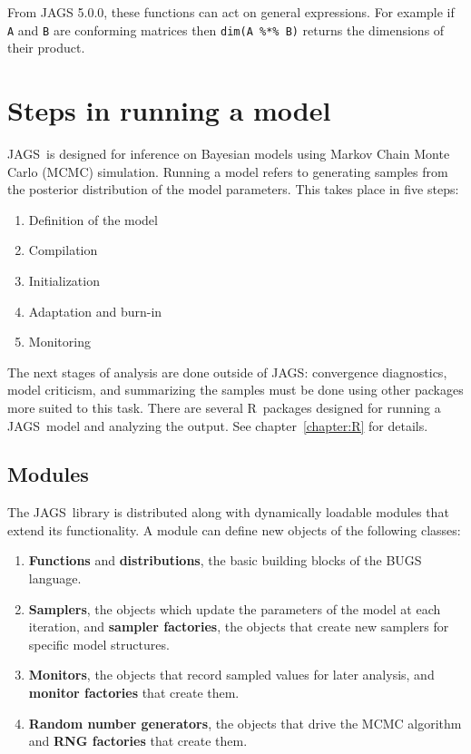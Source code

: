 \documentclass[11pt, a4paper, titlepage]{report}
\newcommand{\JAGS}{\textsf{JAGS}}
\newcommand{\R}{\textsf{R}}
\begin{document}
From JAGS 5.0.0, these functions can act on general expressions. For
example if \texttt{A} and \texttt{B} are conforming matrices then
\verb+dim(A %*% B)+ returns the dimensions of their product.


\chapter{Steps in running a model}
\label{chapter:running}

\JAGS\ is designed for inference on Bayesian models using Markov Chain
Monte Carlo (MCMC) simulation.  Running a model refers to generating
samples from the posterior distribution of the model parameters.  This
takes place in five steps:
\begin{enumerate}
\item Definition of the model
\item Compilation
\item Initialization
\item Adaptation and burn-in
\item Monitoring
\end{enumerate}
The next stages of analysis are done outside of \JAGS: convergence
diagnostics, model criticism, and summarizing the samples must be done
using other packages more suited to this task. There are several
\R\ packages designed for running a \JAGS\ model and analyzing the
output. See chapter~\ref{chapter:R} for details.

\section{Modules}
\label{section:running:modules}

The \JAGS\ library is distributed along with dynamically loadable
modules that extend its functionality.  A module can define new
objects of the following classes:
\begin{enumerate}
\item {\bf Functions} and {\bf distributions}, the basic building
blocks of the BUGS language.
\item {\bf Samplers}, the objects which update the parameters of the
model at each iteration, and {\bf sampler factories}, the objects that 
create new samplers for specific model structures.
\item {\bf Monitors}, the objects that record sampled values for
later analysis, and {\bf monitor factories} that create them. 
\item {\bf Random number generators}, the objects that drive the
MCMC algorithm and {\bf RNG factories} that create them.
\end{enumerate}
\end{document}
